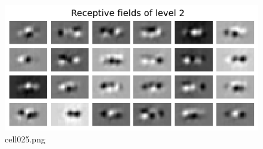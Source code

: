 \begin{figure}[ht]
	\centering
	\includegraphics[scale=0.8, max width=\linewidth]{./fig/energy-based-model/predictive-coding/cell025.png}
	\caption{cell025.png}
	\label{cell025.png}
\end{figure}